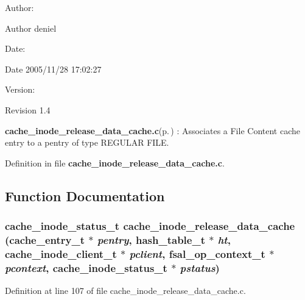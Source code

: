 \begin{Desc}
\item[Author:]\begin{Desc}
\item[Author]deniel \end{Desc}
\end{Desc}
\begin{Desc}
\item[Date:]\begin{Desc}
\item[Date]2005/11/28 17:02:27 \end{Desc}
\end{Desc}
\begin{Desc}
\item[Version:]\begin{Desc}
\item[Revision]1.4 \end{Desc}
\end{Desc}
{\bf cache\_\-inode\_\-release\_\-data\_\-cache.c}{\rm (p.\,\pageref{cache__inode__release__data__cache_8c})} : Associates a File Content cache entry to a pentry of type REGULAR FILE.

Definition in file {\bf cache\_\-inode\_\-release\_\-data\_\-cache.c}.

\subsection{Function Documentation}
\subsubsection{\setlength{\rightskip}{0pt plus 5cm}cache\_\-inode\_\-status\_\-t cache\_\-inode\_\-release\_\-data\_\-cache (cache\_\-entry\_\-t $\ast$ {\em pentry}, hash\_\-table\_\-t $\ast$ {\em ht}, cache\_\-inode\_\-client\_\-t $\ast$ {\em pclient}, fsal\_\-op\_\-context\_\-t $\ast$ {\em pcontext}, cache\_\-inode\_\-status\_\-t $\ast$ {\em pstatus})}\label{cache__inode__release__data__cache_8c_a0}




Definition at line 107 of file cache\_\-inode\_\-release\_\-data\_\-cache.c.